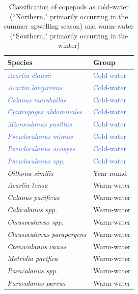 \documentclass[12pt,twoside]{reedthesis}
\begin{document}
\begin{table}	
	\begin{center} 
		\begin{tabular}{l l}  
			\toprule
			Species &  Group \\ 
			\midrule 
			\textcolor{RoyalBlue}{\textit{Acartia clausii}} & 	\textcolor{RoyalBlue}{Cold-water} 	 \\ 
			\textcolor{RoyalBlue}{\textit{Acartia longiremis}}	& \textcolor{RoyalBlue}{Cold-water}  \\
			\textcolor{RoyalBlue}{\textit{Calanus marshallae}}	& \textcolor{RoyalBlue}{Cold-water}  \\
			\textcolor{RoyalBlue}{\textit{Centropages abdominales}}	& \textcolor{RoyalBlue}{Cold-water}  \\
			\textcolor{RoyalBlue}{\textit{Microcalanus pusillus}}	& \textcolor{RoyalBlue}{Cold-water}  \\
			\textcolor{RoyalBlue}{\textit{Pseudocalanus mimus}} & \textcolor{RoyalBlue}{Cold-water}  \\
			\textcolor{RoyalBlue}{\textit{Pseudocalanus acuspes}} & \textcolor{RoyalBlue}{Cold-water}  \\
			\textcolor{RoyalBlue}{\textit{Pseudocalanus spp.}} & \textcolor{RoyalBlue}{Cold-water}  \\
			\textit{Oithona similis}	& Year-round  \\
			\textcolor{RedOrange}{\textit{Acartia tonsa}}	& \textcolor{RedOrange}{Warm-water}  \\
			\textcolor{RedOrange}{\textit{Calanus pacificus}}	& \textcolor{RedOrange}{Warm-water}  \\
			\textcolor{RedOrange}{\textit{Calocalanus spp.}}	& \textcolor{RedOrange}{Warm-water}  \\
			\textcolor{RedOrange}{\textit{Clausocalanus spp.}} & \textcolor{RedOrange}{Warm-water}  \\
			\textcolor{RedOrange}{\textit{Clausocalanus parapergens}} & \textcolor{RedOrange}{Warm-water}  \\
			\textcolor{RedOrange}{\textit{Ctenocalanus vanus}}  & \textcolor{RedOrange}{Warm-water}  \\
			\textcolor{RedOrange}{\textit{Metridia pacifica}}	& \textcolor{RedOrange}{Warm-water}  \\
			\textcolor{RedOrange}{\textit{Paracalanus spp.}}	& \textcolor{RedOrange}{Warm-water}  \\
			\textcolor{RedOrange}{\textit{Paracalanus parvus}} & \textcolor{RedOrange}{Warm-water}  \\
			\bottomrule 
		\end{tabular}
		\caption[Seasonal classification of copepods]{Classification of copepods as cold-water (``Northern," primarily occurring in the summer upwelling season) and warm-water (``Southern," primarily occurring in the winter) \autocite{NOAAFisheries2024, Peterson2003, Peterson1977}}\label{CopepodGroups}  %
	\end{center}
\end{table}
\end{document}
